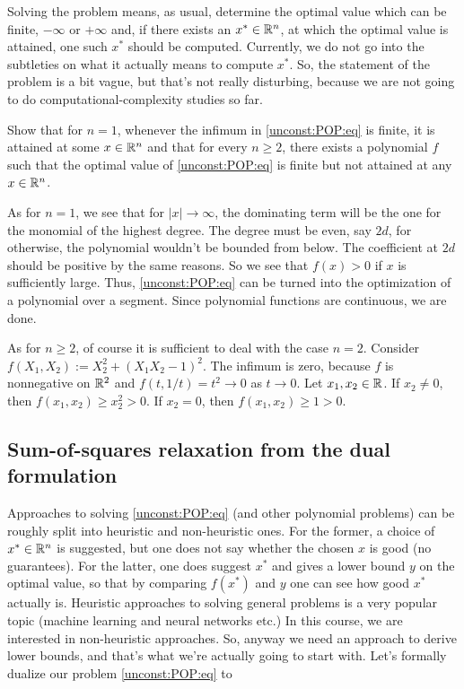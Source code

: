 Solving the problem means, as usual, determine the optimal value which can be finite, $-\infty$ or $+\infty$ and, if there exists an $x^\ast \in \mathbb{R}^n$, at which the optimal value is attained, one such $x^\ast$ should be computed. Currently, we do not go into the subtleties on what it actually means to compute $x^\ast$. So, the statement of the problem is a bit vague, but that's not really disturbing, because we are not going to do computational-complexity studies so far. 


\begin{exercise}
	Show that for $n=1$, whenever the infimum in \eqref{unconst:POP:eq} is finite, it is attained at some $x \in \mathbb{R}^n$ and that for every $n \ge 2$, there exists a polynomial $f$ such that the optimal value of \eqref{unconst:POP:eq} is finite but not attained at any $x \in \mathbb{R}^n$. 
\end{exercise}
\begin{solution}
	As for $n=1$, we see that for $|x| \to \infty$, the dominating term will be the one for the monomial of the highest degree. The degree must be even, say $2d$, for otherwise, the polynomial wouldn't be bounded from below. The coefficient at $2d$ should be positive by the same reasons. So we see that $f(x)>0$ if $x$ is sufficiently large. Thus, \eqref{unconst:POP:eq} can be turned into the optimization of a polynomial over a segment. Since polynomial functions are continuous, we are done. 
	
	As for $n \ge 2$, of course it is sufficient to deal with the case $n=2$. Consider $f(X_1,X_2) := X_2^2 + (X_1 X_2 -1)^2$. The infimum is zero, because $f$ is nonnegative on $\mathbb{R}^2$ and $f(t,1/t) = t^2 \to 0$ as $t \to 0$. Let $x_1, x_2 \in \mathbb{R}$. If $x_2 \ne 0$, then $f(x_1,x_2) \ge x_2^2 > 0$. If $x_2=0$, then $f(x_1,x_2) \ge 1 > 0$. 
\end{solution}

\subsection{Sum-of-squares relaxation from the dual formulation}

Approaches to solving \eqref{unconst:POP:eq} (and other polynomial problems) can be roughly split into heuristic and non-heuristic ones. For the former, a choice of $x^\ast \in \mathbb{R}^n$ is suggested, but one does not say whether the chosen $x$ is good (no guarantees). For the latter, one does suggest $x^\ast$ and gives a lower bound $y$ on the optimal value, so that by comparing $f(x^\ast)$ and $y$ one can see how good $x^\ast$ actually is. Heuristic approaches to solving general problems is a very popular topic (machine learning and neural networks etc.) In this course, we are interested in non-heuristic approaches. So, anyway we need an approach to derive lower bounds, and that's what we're actually going to start with. Let's formally dualize our problem \eqref{unconst:POP:eq} to

